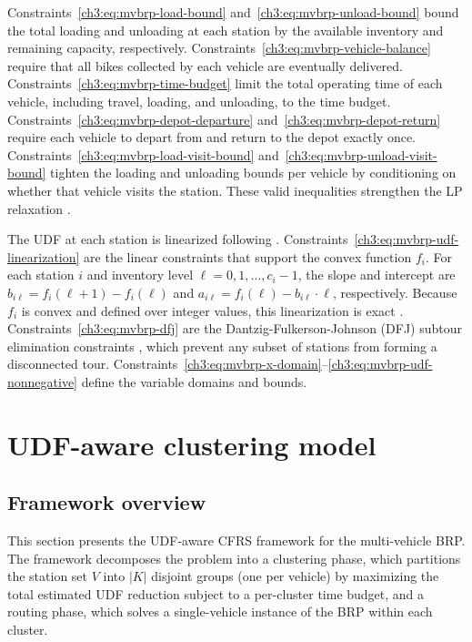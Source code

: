 Constraints~\eqref{ch3:eq:mvbrp-load-bound} and~\eqref{ch3:eq:mvbrp-unload-bound} bound the total loading and unloading at each station by the available inventory and remaining capacity, respectively. Constraints~\eqref{ch3:eq:mvbrp-vehicle-balance} require that all bikes collected by each vehicle are eventually delivered. Constraints~\eqref{ch3:eq:mvbrp-time-budget} limit the total operating time of each vehicle, including travel, loading, and unloading, to the time budget. Constraints~\eqref{ch3:eq:mvbrp-depot-departure} and~\eqref{ch3:eq:mvbrp-depot-return} require each vehicle to depart from and return to the depot exactly once. Constraints~\eqref{ch3:eq:mvbrp-load-visit-bound} and~\eqref{ch3:eq:mvbrp-unload-visit-bound} tighten the loading and unloading bounds per vehicle by conditioning on whether that vehicle visits the station. These valid inequalities strengthen the LP relaxation \citep{ravivStaticRepositioningBikesharing2013}.

The UDF at each station is linearized following \citet{ravivStaticRepositioningBikesharing2013}. Constraints~\eqref{ch3:eq:mvbrp-udf-linearization} are the linear constraints that support the convex function ${{f}_{i}}$. For each station $i$ and inventory level $\ell =0,1,\ldots ,{{c}_{i}}-1$, the slope and intercept are ${{b}_{i\ell }}={{f}_{i}}\left( \ell +1 \right)-{{f}_{i}}\left( \ell  \right)$ and ${{a}_{i\ell }}={{f}_{i}}\left( \ell  \right)-{{b}_{i\ell }}\cdot \ell $, respectively. Because $f_i$ is convex and defined over integer values, this linearization is exact \citep{ravivStaticRepositioningBikesharing2013}. Constraints~\eqref{ch3:eq:mvbrp-dfj} are the Dantzig-Fulkerson-Johnson (DFJ) subtour elimination constraints \citep{dantzigSolutionLargescaleTravelingsalesman1954}, which prevent any subset of stations from forming a disconnected tour. Constraints~\eqref{ch3:eq:mvbrp-x-domain}--\eqref{ch3:eq:mvbrp-udf-nonnegative} define the variable domains and bounds.

\section{UDF-aware clustering model}\label{ch3:sec:udf-aware-clustering-model}

\subsection{Framework overview}\label{ch3:subsec:cfrs-framework}

This section presents the UDF-aware CFRS framework for the multi-vehicle BRP. The framework decomposes the problem into a clustering phase, which partitions the station set $V$ into $\left|K\right|$ disjoint groups (one per vehicle) by maximizing the total estimated UDF reduction subject to a per-cluster time budget, and a routing phase, which solves a single-vehicle instance of the BRP within each cluster.

